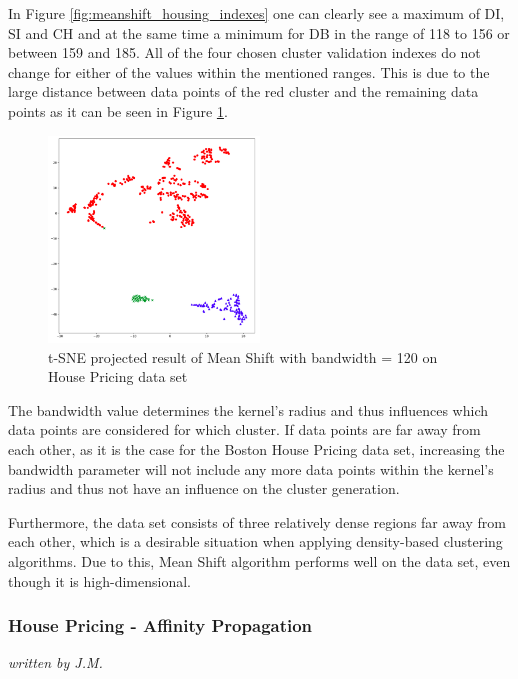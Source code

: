 In Figure \ref{fig:meanshift_housing_indexes} one can clearly see a maximum of DI, SI and CH and at the same time a minimum for DB in the range of 118 to 156 or between 159 and 185. All of the four chosen cluster validation indexes do not change for either of the values within the mentioned ranges. This is due to the large distance between data points of the red cluster and the remaining data points as it can be seen in Figure \ref{fig:meanshift_housing_120}.

\begin{figure}[H]
\begin{center}
\includegraphics[width=0.5\textwidth]{images/Meanshift_Housing_120.png}
\end{center}
\caption{t-SNE projected result of Mean Shift with bandwidth = 120 on House Pricing data set}
\label{fig:meanshift_housing_120}
\end{figure}

The bandwidth value determines the kernel's radius and thus influences which data points are considered for which cluster. If data points are far away from each other, as it is the case for the Boston House Pricing data set, increasing the bandwidth parameter will not include any more data points within the kernel's radius and thus not have an influence on the cluster generation. 

Furthermore, the data set consists of three relatively dense regions far away from each other, which is a desirable situation when applying density-based clustering algorithms. Due to this, Mean Shift algorithm performs well on the data set, even though it is high-dimensional.

\subsubsection{House Pricing - Affinity Propagation}
\textit{written by J.M.}\\

